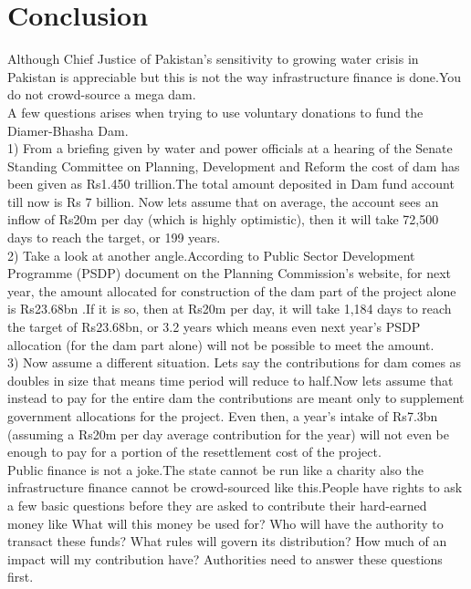 \documentclass[11pt, journal,letterpaper,compsoc]{IEEEtran}
\begin{document}
\section{Conclusion}
Although Chief Justice of Pakistan's sensitivity to growing water crisis in Pakistan is appreciable but this is not the way infrastructure finance is done.You do not crowd-source a mega dam.\\
A few questions arises when trying to use voluntary donations to fund the Diamer-Bhasha Dam.\\
1) From a briefing given by water and power officials at a hearing of the Senate Standing Committee on Planning, Development and Reform the cost of dam has been given as Rs1.450 trillion.The total amount deposited in Dam fund account till now is Rs 7 billion.
Now lets assume that on average, the account sees an inflow of Rs20m per day (which is highly optimistic), then it will take 72,500 days to reach the target, or 199 years.\\
2) Take a look at another angle.According to Public Sector Development Programme (PSDP) document on the Planning Commission’s website, for next year, the amount allocated for construction of the dam part of the project alone is Rs23.68bn .If it is so,
then at Rs20m per day, it will take 1,184 days to reach the target of Rs23.68bn, or 3.2 years which means even next year’s PSDP allocation (for the dam part alone) will not be possible to meet the amount. \\
3) Now assume a different situation. Lets say the contributions for dam comes as doubles in size that means time period will reduce to half.Now lets assume that instead to pay for the entire dam the contributions are meant only to supplement government allocations for the project. Even then, a year’s intake of Rs7.3bn (assuming a Rs20m per day average contribution for the year) will not even be enough to pay for a portion of the resettlement cost of the project. \\
Public finance is not a joke.The state cannot be run like a charity also the infrastructure finance cannot be crowd-sourced like this.People have rights to ask a few basic questions before they are asked to contribute their hard-earned money like What will this money be used for? Who will have the authority to transact these funds? What rules will govern its distribution? How much of an impact will my contribution have? Authorities need to answer these questions first.
\end{document}
